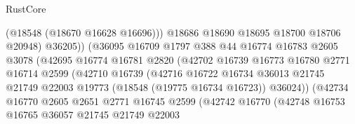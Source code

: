 \begin{lexlean}{RustCore}
\begin{coremodule}
                                        (@18548 (@18670 @16628 @16696)))
                                      @18686
                                      @18690
                                      @18695
                                      @18700
                                      @18706
                                      @20948)
                                    @36205))
                                (@36095
                                  @16709
                                  @1797
                                  @388
                                  @44
                                  @16774
                                  @16783
                                  @2605
                                  @3078
                                  (@42695
                                    @16774
                                    @16781
                                    @2820
                                    (@42702
                                      @16739
                                      @16773
                                      @16780
                                      @2771
                                      @16714
                                      @2599
                                      (@42710
                                        @16739
                                        (@42716
                                          @16722
                                          @16734
                                          @36013
                                          @21745
                                          @21749
                                          @22003
                                          @19773
                                          (@18548 (@19775 @16734 @16723))
                                          @36024))
                                      (@42734
                                        @16770
                                        @2605
                                        @2651
                                        @2771
                                        @16745
                                        @2599
                                        (@42742
                                          @16770
                                          (@42748
                                            @16753
                                            @16765
                                            @36057
                                            @21745
                                            @21749
                                            @22003

\end{coremodule}
\end{lexlean}
